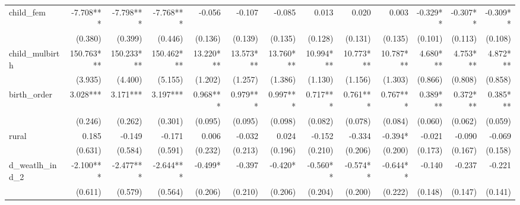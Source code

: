 \begin{tabular}{lrrrrrrrrrrrr}
child\_fem                                  &    -7.708*** &    -7.798*** &    -7.768*** &       -0.056 &       -0.107 &       -0.085 &        0.013 &        0.020 &        0.003 &     -0.329** &     -0.307** &     -0.309** \\ 
                                            &      (0.380) &      (0.399) &      (0.446) &      (0.136) &      (0.139) &      (0.135) &      (0.128) &      (0.131) &      (0.135) &      (0.101) &      (0.113) &      (0.108) \\ 
child\_mulbirth                             &   150.763*** &   150.233*** &   150.462*** &    13.220*** &    13.573*** &    13.760*** &    10.994*** &    10.773*** &    10.787*** &     4.680*** &     4.753*** &     4.872*** \\ 
                                            &      (3.935) &      (4.400) &      (5.155) &      (1.202) &      (1.257) &      (1.386) &      (1.130) &      (1.156) &      (1.303) &      (0.866) &      (0.808) &      (0.858) \\ 
birth\_order                                &     3.028*** &     3.171*** &     3.197*** &     0.968*** &     0.979*** &     0.997*** &     0.717*** &     0.761*** &     0.767*** &     0.389*** &     0.372*** &     0.385*** \\ 
                                            &      (0.246) &      (0.262) &      (0.301) &      (0.095) &      (0.095) &      (0.098) &      (0.082) &      (0.078) &      (0.084) &      (0.060) &      (0.062) &      (0.059) \\ 
rural                                       &        0.185 &       -0.149 &       -0.171 &        0.006 &       -0.032 &        0.024 &       -0.152 &       -0.334 &      -0.394* &       -0.021 &       -0.090 &       -0.069 \\ 
                                            &      (0.631) &      (0.584) &      (0.591) &      (0.232) &      (0.213) &      (0.196) &      (0.210) &      (0.206) &      (0.200) &      (0.173) &      (0.167) &      (0.158) \\ 
d\_weatlh\_ind\_2                           &    -2.100*** &    -2.477*** &    -2.644*** &      -0.499* &       -0.397 &      -0.420* &     -0.560** &     -0.574** &     -0.644** &       -0.140 &       -0.237 &       -0.221 \\ 
                                            &      (0.611) &      (0.579) &      (0.564) &      (0.206) &      (0.210) &      (0.206) &      (0.204) &      (0.200) &      (0.222) &      (0.148) &      (0.147) &      (0.141) \\ 

\end{tabular}
